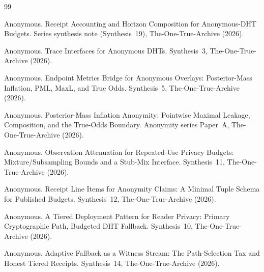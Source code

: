 \documentclass[11pt]{article}
\theoremstyle{definition}
\begin{document}
\begin{thebibliography}{99}\small

Anonymous.
\newblock Receipt Accounting and Horizon Composition for Anonymous-DHT Budgets.
\newblock Series synthesis note (Synthesis~19), The-One-True-Archive (2026).

Anonymous.
\newblock Trace Interfaces for Anonymous DHTs.
\newblock Synthesis~3, The-One-True-Archive (2026).

Anonymous.
\newblock Endpoint Metrics Bridge for Anonymous Overlays: Posterior-Mass Inflation, PML, MaxL, and True Odds.
\newblock Synthesis~5, The-One-True-Archive (2026).

Anonymous.
\newblock Posterior-Mass Inflation Anonymity: Pointwise Maximal Leakage, Composition, and the True-Odds Boundary.
\newblock Anonymity series Paper~A, The-One-True-Archive (2026).

Anonymous.
\newblock Observation Attenuation for Repeated-Use Privacy Budgets: Mixture/Subsampling Bounds and a Stub-Mix Interface.
\newblock Synthesis~11, The-One-True-Archive (2026).

Anonymous.
\newblock Receipt Line Items for Anonymity Claims: A Minimal Tuple Schema for Published Budgets.
\newblock Synthesis~12, The-One-True-Archive (2026).

Anonymous.
\newblock A Tiered Deployment Pattern for Reader Privacy: Primary Cryptographic Path, Budgeted DHT Fallback.
\newblock Synthesis~10, The-One-True-Archive (2026).

Anonymous.
\newblock Adaptive Fallback as a Witness Stream: The Path-Selection Tax and Honest Tiered Receipts.
\newblock Synthesis~14, The-One-True-Archive (2026).

\end{thebibliography}
\end{document}
